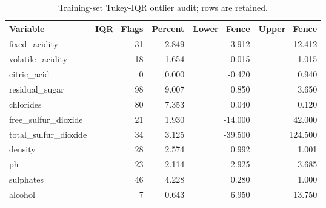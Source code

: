 \begin{table}

\caption{\label{tab:p2-outlier-audit}Training-set Tukey-IQR outlier audit; rows are retained.}
\centering
\begin{tabular}[t]{lrrrr}
\toprule
Variable & IQR\_Flags & Percent & Lower\_Fence & Upper\_Fence\\
\midrule
fixed\_acidity & 31 & 2.849 & 3.912 & 12.412\\
volatile\_acidity & 18 & 1.654 & 0.015 & 1.015\\
citric\_acid & 0 & 0.000 & -0.420 & 0.940\\
residual\_sugar & 98 & 9.007 & 0.850 & 3.650\\
chlorides & 80 & 7.353 & 0.040 & 0.120\\
\addlinespace
free\_sulfur\_dioxide & 21 & 1.930 & -14.000 & 42.000\\
total\_sulfur\_dioxide & 34 & 3.125 & -39.500 & 124.500\\
density & 28 & 2.574 & 0.992 & 1.001\\
ph & 23 & 2.114 & 2.925 & 3.685\\
sulphates & 46 & 4.228 & 0.280 & 1.000\\
\addlinespace
alcohol & 7 & 0.643 & 6.950 & 13.750\\
\bottomrule
\end{tabular}
\end{table}
